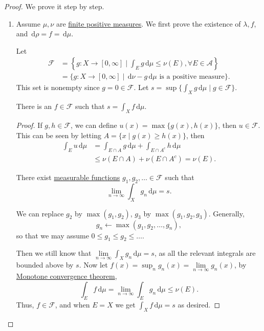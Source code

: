 \begin{proof}
	We prove it step by step.
	\begin{enumerate}
		\item Assume \(\mu, \nu\) are \hyperref[def:finite-signed-measure]{finite positive measures}. We first prove the existence of \(\lambda , f\),
		      and \(\,\mathrm{d} \rho = f = \,\mathrm{d} \mu \).

		      Let
		      \[
			      \begin{split}
				      \mathscr{F} & = \left\{g \colon X \to [0,\infty] \mid \int_E g \,\mathrm{d} \mu \leq \nu(E), \forall E \in \mathcal{A}\right\} \\
				      & = \{g \colon X \to [0,\infty] \mid \,\mathrm{d} \nu - g\,\mathrm{d} \mu \text{ is a positive measure}\}.
			      \end{split}
		      \]
		      This set is nonempty since \(g = 0 \in \mathscr{F}\). Let \(s = \sup\{\int_X g \,\mathrm{d} \mu \mid g \in \mathscr{F}\}\).

		      \begin{claim}
			      There is an \(f \in \mathscr{F}\) such that \(s = \int_X f \,\mathrm{d} \mu\).
		      \end{claim}
		      \begin{proof}
			      If \(g, h \in \mathscr{F}\), we can define \(u(x) = \max\{g(x),h(x)\}\), then \(u \in \mathscr{F}\). This can be seen by letting
			      \(A = \{x \mid g(x) \geq h(x)\}\), then
			      \[
				      \begin{split}
					      \int_E u \,\mathrm{d} \mu & = \int_{E \cap A} g \,\mathrm{d} \mu + \int_{E \cap A^c} h \,\mathrm{d} \mu \\
					      & \leq \nu(E \cap A) + \nu(E \cap A^c) = \nu(E).
				      \end{split}
			      \]

			      There exist \hyperref[def:measurable-function]{measurable functions} \(g_1,g_2,\ldots \in \mathscr{F}\) such that
			      \[
				      \lim_{n \to \infty} \int_X g_n \,\mathrm{d} \mu = s.
			      \]

			      We can replace \(g_2\) by \(\max(g_1,g_2)\), \(g_3\) by \(\max(g_1,g_2,g_3)\). Generally,
			      \[
				      g_{n} \gets \mathop{\max} (g_1, g_2, \ldots , g_n),
			      \]
			      so that we may assume \(0 \leq g_1 \leq g_2 \leq \ldots\).

			      Then we still know that \(\lim\limits_{n \to \infty} \int_X g_n \,\mathrm{d} \mu = s\), as all the relevant integrals are bounded above by \(s\).
			      Now let \(f(x) = \sup_n g_n(x) = \lim\limits_{n \to \infty} g_n(x)\), by \hyperref[thm:MCT]{Monotone convergence theorem},
			      \[
				      \int_E f \,\mathrm{d} \mu = \lim_{n \to \infty} \int_E g_n \,\mathrm{d} \mu \leq \nu(E).
			      \]
			      Thus, \(f \in \mathscr{F}\), and when \(E = X\) we get \(\int_X f \,\mathrm{d} \mu = s\) as desired.
		      \end{proof}


\end{enumerate}
\end{proof}
